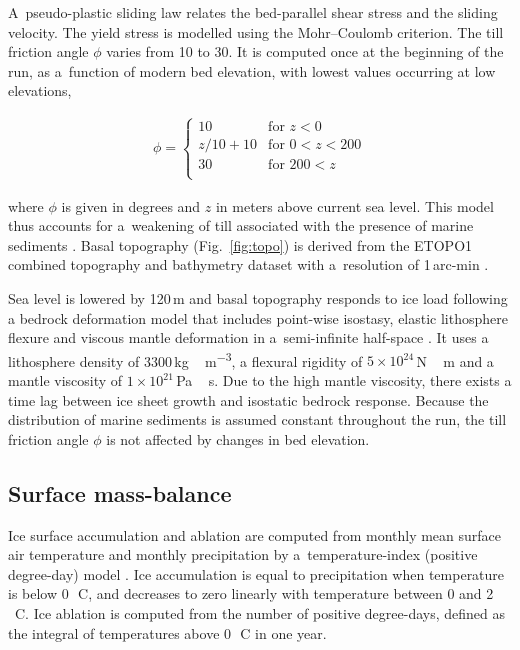 \documentclass[tc, ms]{copernicus}
\begin{document}
A~pseudo-plastic sliding law \citep{aschwanden-etal-2013} relates the bed-parallel shear stress and the sliding velocity. The yield stress is modelled using the Mohr--Coulomb criterion. The till friction angle $\phi$ varies from 10 to 30{\degree}. It is computed once at the beginning of the run, as a~function of modern bed elevation, with lowest values occurring at low elevations,

\begin{align}
  \phi =
  \begin{cases}
    10      & \text{for }       z<  0 \\
    z/10+10 & \text{for }    0 <z<200 \\
    30      & \text{for }  200 <z     \\
  \end{cases}
\end{align}

where $\phi$ is given in degrees and $z$ in meters above current sea level. This model thus accounts for a~weakening of till associated with the presence of marine sediments \citep{martin-etal-2011,aschwanden-etal-2013}. Basal topography (Fig.~\ref{fig:topo}) is derived from the ETOPO1 combined topography and bathymetry dataset with a~resolution of 1\,arc-min \citep{data:etopo1}.

Sea level is lowered by 120\,m and basal topography responds to ice load following a bedrock deformation model that includes point-wise isostasy, elastic lithosphere flexure and viscous mantle deformation in a~semi-infinite half-space \citep{lingle-clark-1985,bueler-etal-2007}. It uses a lithosphere density of 3300\,\unit{kg\,m^{-3}}, a flexural rigidity of $5 \times 10^{24}$\,\unit{N\,m} and a mantle viscosity of $1 \times 10^{21}$\,\unit{Pa\,s}. Due to the high mantle viscosity, there exists a time lag between ice sheet growth and isostatic bedrock response. Because the distribution of marine sediments is assumed constant throughout the run, the till friction angle $\phi$ is not affected by changes in bed elevation.

\subsection{Surface mass-balance}

Ice surface accumulation and ablation are computed from monthly mean surface air temperature and monthly precipitation by a~temperature-index (positive degree-day) model \citep{hock-2003}. Ice accumulation is equal to precipitation when temperature is below 0\,\unit{{\degree}C}, and decreases to zero linearly with temperature between 0 and 2\,\unit{{\degree}C}. Ice ablation is computed from the number of positive degree-days, defined as the integral of temperatures above 0\,\unit{{\degree}C} in one year. 
\end{document}
